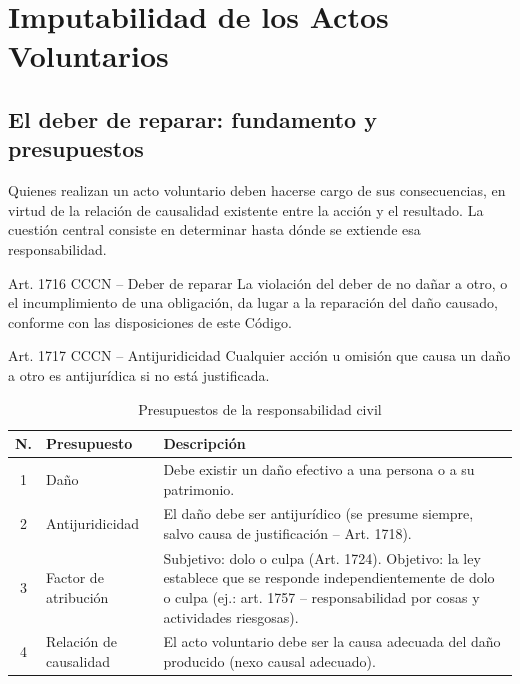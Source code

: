 \documentclass[12pt,oneside]{book}
\begin{document}
\chapter{Imputabilidad de los Actos Voluntarios}

\section{El deber de reparar: fundamento y presupuestos}

Quienes realizan un acto voluntario deben hacerse cargo de sus consecuencias, en virtud de la relación de causalidad existente entre la acción y el resultado. La cuestión central consiste en determinar hasta dónde se extiende esa responsabilidad.

\begin{definition}{Art. 1716 CCCN -- Deber de reparar}
La violación del deber de no dañar a otro, o el incumplimiento de una obligación, da lugar a la reparación del daño causado, conforme con las disposiciones de este Código.
\end{definition}

\begin{definition}{Art. 1717 CCCN -- Antijuridicidad}
Cualquier acción u omisión que causa un daño a otro es antijurídica si no está justificada.
\end{definition}

\begin{table}[H]
\centering
\caption{Presupuestos de la responsabilidad civil}
\begin{tabularx}{\textwidth}{c l X}
\toprule
\textbf{N.\textdegree{}} & \textbf{Presupuesto} & \textbf{Descripción} \\
\midrule
1 & Daño & Debe existir un daño efectivo a una persona o a su patrimonio. \\
2 & Antijuridicidad & El daño debe ser antijurídico (se presume siempre, salvo causa de justificación -- Art. 1718). \\
3 & Factor de atribución & Subjetivo: dolo o culpa (Art. 1724). Objetivo: la ley establece que se responde independientemente de dolo o culpa (ej.: art. 1757 -- responsabilidad por cosas y actividades riesgosas). \\
4 & Relación de causalidad & El acto voluntario debe ser la causa adecuada del daño producido (nexo causal adecuado). \\
\bottomrule
\end{tabularx}
\end{table}
\end{document}
